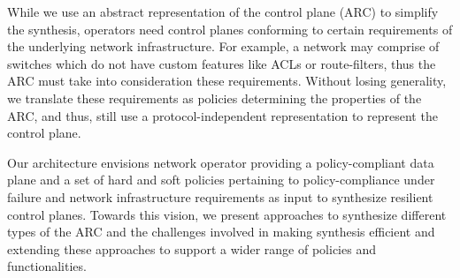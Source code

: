 While we use an abstract representation of the control
plane (ARC) to simplify the synthesis, operators need control 
planes conforming to certain requirements of the 
underlying network infrastructure. For example, a 
network may comprise of switches which do not have custom
features like ACLs or route-filters, thus the ARC must take 
into consideration these requirements. Without losing 
generality, we translate these 
requirements as policies determining the properties of the
ARC, and thus, still use a protocol-independent representation
to represent the control plane. 

Our architecture envisions network operator providing
a policy-compliant data plane and a set of hard and soft policies
pertaining to policy-compliance under failure and network 
infrastructure requirements as input to synthesize resilient 
control planes. Towards this vision, we present  
approaches to synthesize different types of the ARC and the 
challenges involved in making synthesis efficient and
extending these approaches to support a wider range of 
policies and functionalities. 

